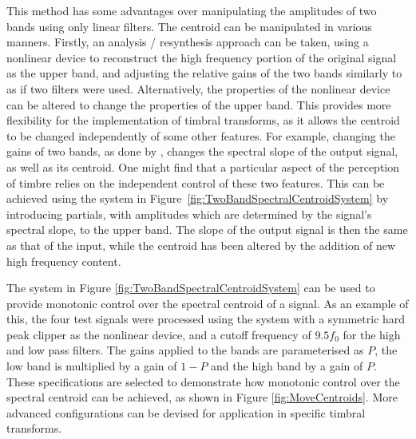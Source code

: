 			This method has some advantages over manipulating the amplitudes of two bands using only linear
			filters. The centroid can be manipulated in various manners. Firstly, an analysis / resynthesis
			approach can be taken, using a nonlinear device to reconstruct the high frequency portion of the
			original signal as the upper band, and adjusting the relative gains of the two bands similarly to
			as if two filters were used.  Alternatively, the properties of the nonlinear device can be altered
			to change the properties of the upper band. This provides more flexibility for the implementation
			of timbral transforms, as it allows the centroid to be changed independently of some other
			features.  For example, changing the gains of two bands, as done by \citet{zacharakis2011an},
			changes the spectral slope of the output signal, as well as its centroid. One might find that a
			particular aspect of the perception of timbre relies on the independent control of these two
			features. This can be achieved using the system in Figure~\ref{fig:TwoBandSpectralCentroidSystem}
			by introducing partials, with amplitudes which are determined by the signal's spectral slope, to
			the upper band.  The slope of the output signal is then the same as that of the input, while the
			centroid has been altered by the addition of new high frequency content.

			The system in Figure \ref{fig:TwoBandSpectralCentroidSystem} can be used to provide monotonic
			control over the spectral centroid of a signal. As an example of this, the four test signals were
			processed using the system with a symmetric hard peak clipper as the nonlinear device, and a cutoff
			frequency of $9.5f_{0}$ for the high and low pass filters. The gains applied to the bands are
			parameterised as $P$, the low band is multiplied by a gain of $1 - P$ and the high band by a gain
			of $P$. These specifications are selected to demonstrate how monotonic control over the spectral
			centroid can be achieved, as shown in Figure \ref{fig:MoveCentroids}. More advanced configurations
			can be devised for application in specific timbral transforms.

